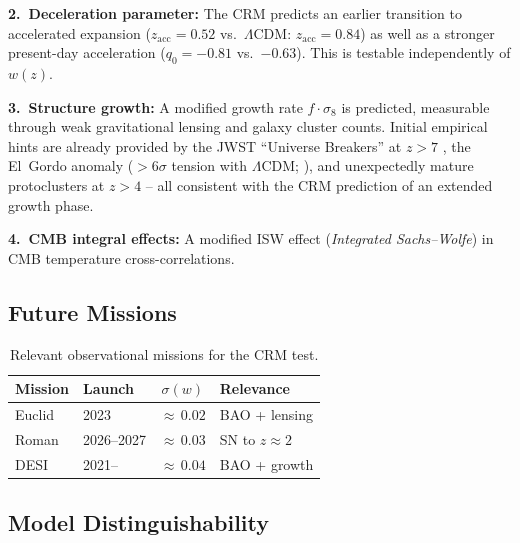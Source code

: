 \documentclass[aps,prd,twocolumn,superscriptaddress,nofootinbib]{revtex4-2}
\begin{document}
\textbf{2.~Deceleration parameter:} The CRM predicts an earlier transition to accelerated expansion ($z_{\mathrm{acc}} = 0.52$ vs.\ $\Lambda$CDM: $z_{\mathrm{acc}} = 0.84$) as well as a stronger present-day acceleration ($q_0 = -0.81$ vs.\ $-0.63$). This is testable independently of $w(z)$.

\textbf{3.~Structure growth:} A modified growth rate $f \cdot \sigma_8$ is predicted, measurable through weak gravitational lensing and galaxy cluster counts. Initial empirical hints are already provided by the JWST ``Universe Breakers'' at $z > 7$ \cite{Labbe2023}, the El~Gordo anomaly ($> 6\sigma$ tension with $\Lambda$CDM; \cite{Asencio2023}), and unexpectedly mature protoclusters at $z > 4$ \cite{Miller2018} -- all consistent with the CRM prediction of an extended growth phase.

\textbf{4.~CMB integral effects:} A modified ISW effect (\textit{Integrated Sachs--Wolfe}) in CMB temperature cross-correlations.

\subsection{Future Missions}

\begin{table}[htbp]
\centering
\caption{Relevant observational missions for the CRM test.}
\label{tab:missions}
\small
\begin{tabular}{llcl}
\toprule
\textbf{Mission} & \textbf{Launch} & $\sigma(w)$ & \textbf{Relevance} \\
\midrule
Euclid & 2023 & ${\approx}\,0.02$ & BAO + lensing \\
Roman & 2026--2027 & ${\approx}\,0.03$ & SN to $z \approx 2$ \\
DESI & 2021-- & ${\approx}\,0.04$ & BAO + growth \\
\bottomrule
\end{tabular}
\end{table}


\subsection{Model Distinguishability}
\end{document}
